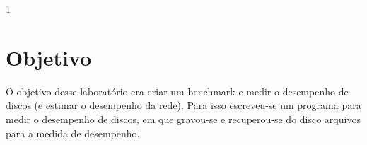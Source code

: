 1\documentclass[10pt,a4paper]{article}
\begin{document}
\setlength{\parskip}{0pt}
\setlength{\parsep}{0pt}
\setlength{\headsep}{0pt}
\setlength{\topskip}{0pt}
\setlength{\topmargin}{0pt}
\setlength{\topsep}{0pt}
\setlength{\partopsep}{0pt}


\begin{minipage}{5cm}
  \vspace{2mm}
\end{minipage}

\vspace{-3mm}

\section{Objetivo}
O objetivo desse laboratório era criar um benchmark e medir o
desempenho de discos (e estimar o desempenho da rede).
Para isso escreveu-se um  programa para medir o desempenho de discos,
em que  gravou-se  e recuperou-se do disco arquivos para a medida de desempenho.

\end{document}
